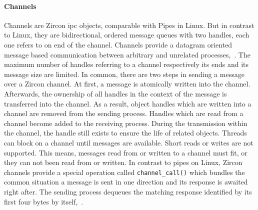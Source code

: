\paragraph{Channels}
Channels are Zircon \ac{ipc} objects, comparable with Pipes in Linux.
But in contrast to Linux, they are bidirectional, ordered message queues with two handles, each one refers to on end of the channel.
Channels provide a datagram oriented message based communication between arbitrary and unrelated processes\cite{zircon-channel},~\cite{zircon-concepts}.
The maximum number of handles referring to a channel respectively its ends and its message size are limited.
In common, there are two steps in sending a message over a Zircon channel.
At first, a message is atomically written into the channel.
Afterwards, the ownership of all handles in the context of the message is transferred into the channel\cite{zircon-channel}.
As a result, object handles which are written into a channel are removed from the sending process.
Handles which are read from a channel become added to the receiving process.
During the transmission within the channel, the handle still exists to ensure the life of related objects\cite{zircon-concepts}.
Threads can block on a channel until messages are available.
Short reads or writes are not supported.
This means, messages read from or written to a channel must fit, or they can not been read from or written.
In contrast to pipes on Linux, Zircon channels provide a special operation called \texttt{channel\_call()} which bundles the common situation a message is sent in one direction and its response is awaited right after.
The sending process dequeues the matching response identified by its first four bytes by itself\cite{zircon-concepts},~\cite{zircon-channel}.

%
%
%
%
%

